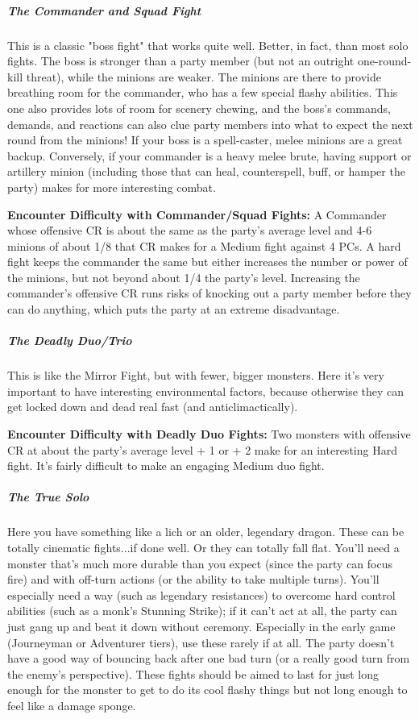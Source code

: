 \documentclass[10pt,twoside,openany,bg=none]{dndbook}
\begin{document}
\subparagraph*{The Commander and Squad Fight} This is a classic "boss fight" that works quite well. Better, in fact, than most solo fights. The boss is stronger than a party member (but not an outright one-round-kill threat), while the minions are weaker. The minions are there to provide breathing room for the commander, who has a few special flashy abilities. This one also provides lots of room for scenery chewing, and the boss's commands, demands, and reactions can also clue party members into what to expect the next round from the minions! If your boss is a spell-caster, melee minions are a great backup. Conversely, if your commander is a heavy melee brute, having support or artillery minion (including those that can heal, counterspell, buff, or hamper the party) makes for more interesting combat.

\textbf{Encounter Difficulty with Commander/Squad Fights:} A Commander whose offensive CR is about the same as the party's average level and 4-6 minions of about 1/8 that CR makes for a Medium fight against 4 PCs. A hard fight keeps the commander the same but either increases the number or power of the minions, but not beyond about 1/4 the party's level. Increasing the commander's offensive CR runs risks of knocking out a party member before they can do anything, which puts the party at an extreme disadvantage.

\subparagraph*{The Deadly Duo/Trio} This is like the Mirror Fight, but with fewer, bigger monsters. Here it's very important to have interesting environmental factors, because otherwise they can get locked down and dead real fast (and anticlimactically).

\textbf{Encounter Difficulty with Deadly Duo Fights:} Two monsters with offensive CR at about the party's average level + 1 or + 2 make for an interesting Hard fight. It's fairly difficult to make an engaging Medium duo fight.

\subparagraph*{The True Solo} Here you have something like a lich or an older, legendary dragon. These can be totally cinematic fights...if done well. Or they can totally fall flat. You'll need a monster that's much more durable than you expect (since the party can focus fire) and with off-turn actions (or the ability to take multiple turns). You'll especially need a way (such as legendary resistances) to overcome hard control abilities (such as a monk's Stunning Strike); if it can't act at all, the party can just gang up and beat it down without ceremony. Especially in the early game (Journeyman or Adventurer tiers), use these rarely if at all. The party doesn't have a good way of bouncing back after one bad turn (or a really good turn from the enemy's perspective). These fights should be aimed to last for just long enough for the monster to get to do its cool flashy things but not long enough to feel like a damage sponge.
\end{document}
